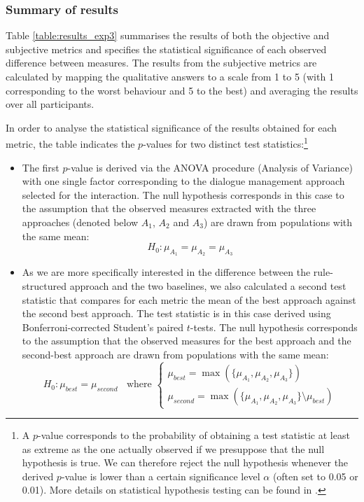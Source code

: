 \subsubsection*{Summary of results}

Table \ref{table:results_exp3} summarises the results of both the objective and subjective metrics and specifies the statistical significance of each observed difference between measures.  The results from the subjective metrics are calculated by mapping the qualitative answers to a scale from 1 to 5 (with 1 corresponding to the worst behaviour and 5 to the best) and averaging the results over all participants. 

In order to analyse the statistical significance of the results obtained for each metric, the table indicates the $p$-values for two distinct test statistics:\footnote{A $p$-value corresponds to the probability of obtaining a test statistic at least as extreme as the one actually observed if we presuppose that the null hypothesis is true.  We can therefore reject the null hypothesis whenever the derived $p$-value is lower than a certain significance level $\alpha$ (often set to 0.05 or 0.01). More details on statistical hypothesis testing can be found in \cite[][chapter 8]{Ross2009293}. }
\begin{itemize}
\item The first $p$-value is derived via the ANOVA procedure (Analysis of Variance) with one single factor corresponding to the dialogue management approach selected for the interaction. The null hypothesis  corresponds in this case to the assumption that the observed measures extracted with the three approaches (denoted below $A_1$, $A_2$ and $A_3$) are drawn from populations with the same mean:
\begin{equation}
H_0 : \mu_{A_1} = \mu_{A_2} = \mu_{A_3}
\end{equation}  

\item As we are more specifically interested in the difference between the rule-structured approach and the two baselines, we also calculated a second test statistic that compares for each metric the mean of the best approach against the second best approach. The test statistic is in this case derived using Bonferroni-corrected Student's paired $t$-tests.  The null hypothesis corresponds to the assumption that the observed measures for the best approach and the second-best  approach are drawn from populations with the same mean:
\begin{equation}
H_0 : \mu_{\mathit{best}} = \mu_{\mathit{second}} \ \  \ \ \text{where } \begin{cases}\mu_{\mathit{best}} = \max(\{\mu_{A_1}, \mu_{A_2}, \mu_{A_3}\}) \\ 
\mu_{\mathit{second}} = \max(\{\mu_{A_1}, \mu_{A_2}, \mu_{A_3}\} \setminus \mu_{\mathit{best}}) 
\end{cases}
\end{equation}

\end{itemize}

